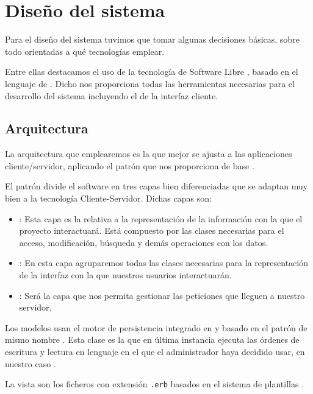 \section{Diseño del sistema}
Para el diseño del sistema tuvimos que tomar algunas decisiones básicas, sobre
todo orientadas a qué tecnologías emplear.

Entre ellas destacamos el uso de la tecnología de Software Libre , basado en el lenguaje de  . Dicho
 nos proporciona todas las herramientas necesarias para el
desarrollo del sistema incluyendo el de la interfaz cliente.

\subsection{Arquitectura}
La arquitectura que emplearemos es la que mejor se ajusta a las aplicaciones
cliente/servidor, aplicando el patrón  que nos
proporciona de base  \cite{agilerails}.

El patrón  divide el software en tres capas
bien diferenciadas que se adaptan muy bien a la tecnología
Cliente-Servidor. Dichas capas son:

\begin{itemize}
\item {}: Esta capa es la relativa a la representación de la
  información con la que el proyecto interactuará. Está compuesto por las clases
  necesarias para el acceso, modificación, búsqueda y demás operaciones con los
  datos.
\item {}: En esta capa agruparemos todas las clases necesarias para
  la representación de la interfaz con la que nuestros usuarios interactuarán.
\item {}: Será la capa que nos permita gestionar las
  peticiones que lleguen a nuestro servidor.
\end{itemize}

Los modelos usan el motor de persistencia  integrado en
 y basado en el patrón de mismo nombre 
\cite{pattern:activerecord}. Esta clase es la que en última instancia ejecuta
las órdenes de escritura y lectura en lenguaje  en el
 que el administrador haya decidido usar, en nuestro caso
.

La vista son los ficheros con extensión \texttt{.erb} basados en el sistema de
plantillas .

